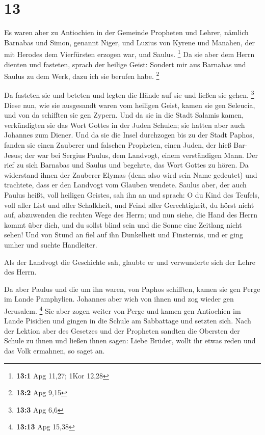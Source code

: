 \hypertarget{section-4}{%
\section{13}\label{section-4}}

 Es waren aber zu Antiochien in der Gemeinde Propheten und
Lehrer, nämlich Barnabas und Simon, genannt Niger, und Luzius von Kyrene
und Manahen, der mit Herodes dem Vierfürsten erzogen war, und Saulus.
\footnote{\textbf{13:1} Apg 11,27; 1Kor 12,28}  Da sie
aber dem Herrn dienten und fasteten, sprach der heilige Geist: Sondert
mir aus Barnabas und Saulus zu dem Werk, dazu ich sie berufen habe.
\footnote{\textbf{13:2} Apg 9,15}

 Da fasteten sie und beteten und legten die Hände auf sie
und ließen sie gehen. \footnote{\textbf{13:3} Apg 6,6} 
Diese nun, wie sie ausgesandt waren vom heiligen Geist, kamen sie gen
Seleucia, und von da schifften sie gen Zypern.  Und da sie
in die Stadt Salamis kamen, verkündigten sie das Wort Gottes in der
Juden Schulen; sie hatten aber auch Johannes zum Diener. 
Und da sie die Insel durchzogen bis zu der Stadt Paphos, fanden sie
einen Zauberer und falschen Propheten, einen Juden, der hieß Bar-Jesus;
 der war bei Sergius Paulus, dem Landvogt, einem
verständigen Mann. Der rief zu sich Barnabas und Saulus und begehrte,
das Wort Gottes zu hören.  Da widerstand ihnen der
Zauberer Elymas (denn also wird sein Name gedeutet) und trachtete, dass
er den Landvogt vom Glauben wendete.  Saulus aber, der
auch Paulus heißt, voll heiligen Geistes, sah ihn an  und
sprach: O du Kind des Teufels, voll aller List und aller Schalkheit, und
Feind aller Gerechtigkeit, du hörst nicht auf, abzuwenden die rechten
Wege des Herrn;  und nun siehe, die Hand des Herrn kommt
über dich, und du sollst blind sein und die Sonne eine Zeitlang nicht
sehen! Und von Stund an fiel auf ihn Dunkelheit und Finsternis, und er
ging umher und suchte Handleiter.

 Als der Landvogt die Geschichte sah, glaubte er und
verwunderte sich der Lehre des Herrn.

 Da aber Paulus und die um ihn waren, von Paphos
schifften, kamen sie gen Perge im Lande Pamphylien. Johannes aber wich
von ihnen und zog wieder gen Jerusalem. \footnote{\textbf{13:13} Apg
  15,38}  Sie aber zogen weiter von Perge und kamen gen
Antiochien im Lande Pisidien und gingen in die Schule am Sabbattage und
setzten sich.  Nach der Lektion aber des Gesetzes und der
Propheten sandten die Obersten der Schule zu ihnen und ließen ihnen
sagen: Liebe Brüder, wollt ihr etwas reden und das Volk ermahnen, so
saget an.

